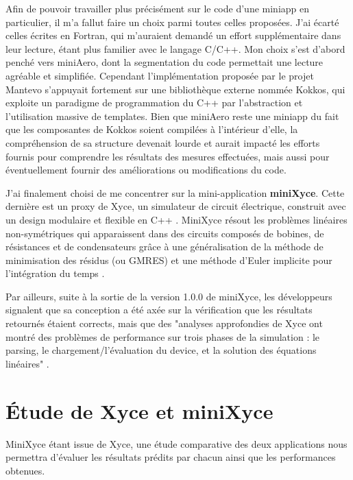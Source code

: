 \documentclass[11pt,a4paper,oneside]{memoir}
\theoremstyle{definition}
\theoremstyle{remark}
\theoremstyle{plain}
\begin{document}
Afin de pouvoir travailler plus précisément sur le code d'une miniapp en particulier, il m'a fallut faire un choix parmi toutes celles proposées. J'ai écarté celles écrites en Fortran, qui m'auraient demandé un effort supplémentaire dans leur lecture, étant plus familier avec le langage C/C++. Mon choix s'est d'abord penché vers miniAero, dont la segmentation du code permettait une lecture agréable et simplifiée. Cependant l'implémentation proposée par le projet Mantevo \cite{miniaero-code} s'appuyait fortement sur une bibliothèque externe nommée Kokkos, qui exploite un paradigme de programmation du C++ par l'abstraction et l'utilisation massive de templates. Bien que miniAero reste une miniapp du fait que les composantes de Kokkos soient compilées à l'intérieur d'elle, la compréhension de sa structure devenait lourde et aurait impacté les efforts fournis pour comprendre les résultats des mesures effectuées, mais aussi pour éventuellement fournir des améliorations ou modifications du code.\bigskip

J'ai finalement choisi de me concentrer sur la mini-application \textbf{miniXyce}. Cette dernière est un proxy de Xyce, un simulateur de circuit électrique, construit avec un design modulaire et flexible en C++ \cite{xyce}. MiniXyce résout les problèmes linéaires non-symétriques qui apparaissent dans des circuits composés de bobines, de résistances et de condensateurs grâce à une généralisation de la méthode de minimisation des résidus (ou GMRES) et une méthode d'Euler implicite pour l'intégration du temps \cite{minixyce-code}.

Par ailleurs, suite à la sortie de la version 1.0.0 de miniXyce, les développeurs signalent que sa conception a été axée sur la vérification que les résultats retournés étaient corrects, mais que des "analyses approfondies de Xyce ont montré des problèmes de performance sur trois phases de la simulation : le parsing, le chargement/l'évaluation du device, et la solution des équations linéaires" \cite{minixyce-code}.









\chapter{\'Etude de Xyce et miniXyce}

MiniXyce étant issue de Xyce, une étude comparative des deux applications nous permettra d'évaluer les résultats prédits par chacun ainsi que les performances obtenues.
\end{document}
